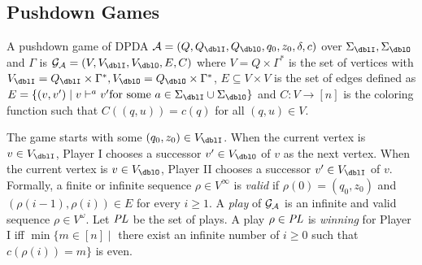 \subsection{Pushdown Games}

\begin{definition}
A {pushdown game} of DPDA $\calA = (Q, Q_\dblI, Q_\dblO, q_0, z_0, \delta, c)$ over $\Sigma_\dblI, \Sigma_\dblO$ and $\Gamma$ is $\calG_\calA = (V, V_\dblI, V_\dblO, E, C)$ where
$V = Q\times\Gamma^*$ is the set of vertices with $V_\dblI = Q_\dblI\times\Gamma^*, V_\dblO = Q_\dblO\times\Gamma^*$, $E\subseteq V\times V$ is the set of edges defined as $E = \{(v,v') \mid v \vdash^a v' \text{for some $a\in \Sigma_\dblI\cup\Sigma_\dblO$}\}$
and $C: V \to [n]$ is the coloring function such that
$C((q,u)) = c(q)$ for all $(q,u)\in V$.
\end{definition}

The game starts with some $(q_0,z_0)\in V_\dblI$.
When the current vertex is $v\in V_\dblI$,
Player I chooses a successor $v'\in V_\dblO$ of $v$ as the next vertex.
When the current vertex is $v\in V_\dblO$,
Player II chooses a successor $v'\in V_\dblI$ of $v$.
Formally, a finite or infinite sequence $\rho\in V^\infty$ is
\emph{valid} if
$\rho(0)=(q_0,z_0)$ and
$(\rho(i-1), \rho(i))\in E$ for every $i\geq 1$.
A \emph{play} of ${\cal G}_{\cal A}$ is an infinite and valid sequence $\rho\in V^\omega$.
Let $\mathit{PL}$ be the set of plays.
A play $\rho\in \mathit{PL}$ is \emph{winning} for Player I iff
$\min\{m\in[n] \mid $ there exist an infinite
number of $i\geq 0$ such that $c(\rho(i)) = m\}$ is even.

